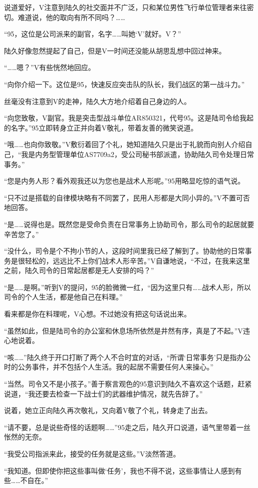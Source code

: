说道爱好，V注意到陆久的社交面并不广泛，只和某位男性飞行单位管理者来往密切。难道说，他的取向有所不同吗？……

“95，这位是公司派来的副官，名字……叫她‘V’就好。V？”

陆久好像忽然提起了自己，但是V一时间还没能从胡思乱想中回过神来。

“……嗯？”V有些恍然地回应。

“向你介绍一下。这位是95，快速反应突击队的队长，我们战区的第一战斗力。”

丝毫没有注意到V的走神，陆久大方地介绍着自己身边的人。

“向您致敬，V副官。我是突击型战斗单位AR850321，代号95。这是陆司令给我起的名字。”95立即转身立正并向着V敬礼，带着友善的微笑说道。

“哦……也向你致敬。”V敷衍着回了个礼，她知道陆久只是出于礼貌而向别人介绍自己，“我是内务型管理单位AS7709a2，受公司秘书部派遣，协助陆久司令处理日常事务。”

“您是内务人形？看外观我还以为您也是战术人形呢。”95用略显吃惊的语气说。

“只不过是搭载的自律模块略有不同罢了，民用人形都是大同小异的。”V不置可否地回答。

“是……说得也是。既然您是受命负责在日常事务上协助司令，那么司令的起居就要辛苦您了。”

“没什么，司令是个不拘小节的人，这段时间里我已经了解到了。协助他的日常事务是很轻松的，远远比不上你们战术人形辛苦。”V自谦地说，“不过，在我来这里之前，陆久司令的日常起居都是无人安排的吗？”

“是……是啊。”听到V的提问，95的脸微微一红，“因为这里只有……战术人形，所以司令的个人生活，都是他自己在料理。”

看来都是你在料理呢，V心想。不过她没有把这句话说出来。

“虽然如此，但是陆司令的办公室和休息场所依然是井然有序，真是了不起。”V违心地说着。

“咳……”陆久终于开口打断了两个人不合时宜的对话，“所谓‘日常事务’只是指办公时的公务事件，并不包括个人生活。我的起居不需要任何人来操心。”

“当然。司令又不是小孩子。”善于察言观色的95意识到陆久不喜欢这个话题，赶紧说道，“我还要去检查一下战士们的武器维护情况，就先告辞了。”

说着，她立正向陆久再次敬礼，又向着V敬了个礼，转身走了出去。

“请不要，总是说些奇怪的话题啊……”95走之后，陆久开口说道，语气里带着一丝怅然的无奈。

“我受公司指派来此，接受的任务就是这些。”V淡然答道。

“我知道。但即使你把这些事叫做‘任务’，我也不得不说，这些事情让人感到有些……不自在。”

